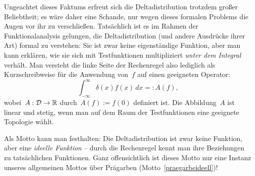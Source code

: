 Ungeachtet dieses Faktums erfreut sich die Deltadistribution trotzdem großer
Beliebtheit; es wäre daher eine Schande, nur wegen dieses formalen Problems die
Augen vor ihr zu verschließen. Tatsächlich ist es im Rahmen der
Funktionalanalysis gelungen, die Deltadistribution (und andere Ausdrücke ihrer
Art) formal zu verstehen: Sie ist zwar keine eigenständige Funktion, aber man
kann erklären, wie sie sich mit Testfunktionen multipliziert \emph{unter dem
Integral} verhält. Man versteht die linke Seite der Rechenregel also lediglich
als Kurzschreibweise für die Anwendung von~$f$ auf einen geeigneten Operator:
\[ \int_{-\infty}^\infty \delta(x) f(x) \,dx =: A(f), \]
wobei~$A : \mathcal{D} \to \mathbb{R}$ durch~$A(f) := f(0)$ definiert ist. Die Abbildung~$A$
ist linear und stetig, wenn man auf dem Raum der Testfunktionen eine geeignete
Topologie wählt.

Als Motto kann man festhalten: Die Deltadistribution ist zwar keine Funktion,
aber eine \emph{ideelle Funktion} -- durch die Rechenregel kennt man ihre
Beziehungen zu tatsächlichen Funktionen. Ganz offensichtlich ist dieses Motto
nur eine Instanz unseres allgemeinen Mottos über Prägarben
(Motto~\ref{praegarbeideell})!



